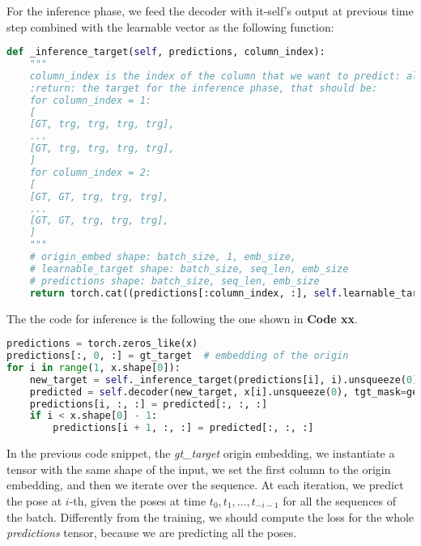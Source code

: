 For the inference phase, we feed the decoder with it-self's output at previous time step combined with the learnable vector as the following function:
\begin{lstlisting}[captionpos=b, label={lst:lst-inference-target}, caption={Inference target}, language=Python]
def _inference_target(self, predictions, column_index):
    """
    column_index is the index of the column that we want to predict: always 0 < x < seq_len
    :return: the target for the inference phase, that should be:
    for column_index = 1:
    [
    [GT, trg, trg, trg, trg],
    ...
    [GT, trg, trg, trg, trg],
    ]
    for column_index = 2:
    [
    [GT, GT, trg, trg, trg],
    ...
    [GT, GT, trg, trg, trg],
    ]
    """
    # origin_embed shape: batch_size, 1, emb_size,
    # learnable_target shape: batch_size, seq_len, emb_size
    # predictions shape: batch_size, seq_len, emb_size
    return torch.cat((predictions[:column_index, :], self.learnable_target[column_index:, :]), dim=0)
\end{lstlisting}

The the code for inference is the following the one shown in \textbf{Code xx}.
\begin{lstlisting}[captionpos=b, label={lst:lst-inference}, caption={Inference}, language=Python]
predictions = torch.zeros_like(x)
predictions[:, 0, :] = gt_target  # embedding of the origin
for i in range(1, x.shape[0]):
    new_target = self._inference_target(predictions[i], i).unsqueeze(0)
    predicted = self.decoder(new_target, x[i].unsqueeze(0), tgt_mask=generate_upper_triangular_mask(x.shape).to(self.device))
    predictions[i, :, :] = predicted[:, :, :]
    if i < x.shape[0] - 1:
        predictions[i + 1, :, :] = predicted[:, :, :]
\end{lstlisting}
In the previous code snippet, the \textit{gt\_target} origin embedding, we instantiate a tensor with the same shape of the input, we set the first column to the origin embedding, and then we iterate over the sequence.
At each iteration, we predict the pose at $i$-th, given the poses at time $t_0, t_1, \dots, t_{-i-1}$ for all the sequences of the batch.
Differently from the training, we should compute the loss for the whole \textit{predictions} tensor, because we are predicting all the poses.
